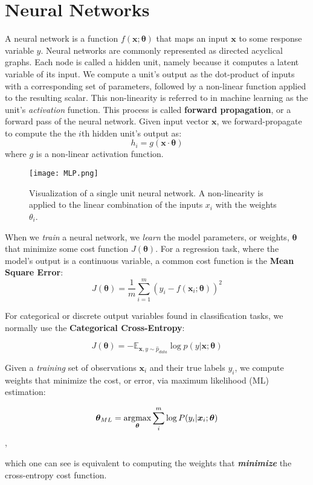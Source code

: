 \section{Neural Networks}
A neural network is a function $f(\bm{x};\bm{\theta})$ that maps an input $\bm{x}$ to some response variable $y$.
Neural networks are commonly represented as directed acyclical graphs. Each node is called a hidden unit, namely because it computes a latent variable of its input.
We compute a unit's output as the dot-product of inputs with a corresponding set of parameters, followed by a non-linear function applied to the resulting scalar.
This non-linearity is referred to in machine learning as the unit's \textit{activation} function. This process is called \textbf{forward propagation}, or a forward pass of the
neural network. Given input vector $\bm{x}$, we forward-propagate to compute the the $i$th hidden unit's output as:
\[h_i = g(\bm{x} \cdot \bm{\theta} )\]
where $g$ is a non-linear activation function.
\begin{figure}[H]
\centering
\texttt{[image: MLP.png]}
\caption{Visualization of a single unit neural network. A non-linearity is applied to the linear combination of the
inputs $x_i$ with the weights $\theta_i$.}
\end{figure}
When we \textit{train} a
neural network, we \textit{learn} the model parameters, or weights, $\bm{\theta}$ that minimize some cost function $J(\bm{\theta})$.
For a regression task, where the model's output is a continuous variable, a common cost function is the \textbf{Mean Square Error}:
\[J(\bm{\theta}) = \frac{1}{m}\sum_{i=1}^{m}(y_{i} - f(\bm{x}_{i};\bm{\theta}))^{2}\]

For categorical or discrete output variables found in classification tasks, we normally use the \textbf{Categorical Cross-Entropy}:

\[J(\bm{\theta}) = -\mathbb{E}_{\bm{x},y \sim \hat p_{data}} \log \textit{p}(y|\bm{x};\bm{\theta})\]

Given a \textit{training} set of observations $\bm{x}_i$ and their true labels $y_i$, we compute weights that minimize the cost, or error, via
maximum likelihood (ML) estimation:

\[\bm{\theta}_{ML} = \operatorname*{\arg\!\max}_{\bm{\theta}} \sum_{i}^{m} \log P(y_{i}|\bm{x}_{i};\bm{\theta})\],

which one can see is equivalent to computing the weights that \textbf{\textit{minimize}} the cross-entropy cost function.



